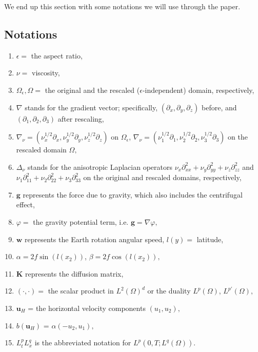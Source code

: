\documentclass[11pt]{article}
\begin{document}
We end up this section with some notations we will use through the paper.

\subsection{Notations}

\begin{enumerate}

\item $\epsilon = $ the aspect ratio,
\item $\nu = $ viscosity,
\item $\Omega_\epsilon, \Omega = $ the original and the rescaled ($\epsilon$-independent) domain, respectively,
\item $\nabla$ stands for the gradient vector; specifically, $(\partial_x, \partial_y, \partial_z)$ before, and $(\partial_1, \partial_2, \partial_3)$ after rescaling,
\item $\nabla_\nu = (\nu_x^{1/2} \partial_x, \nu_y^{1/2} \partial_y, \nu_z^{1/2} \partial_z)$ on $\Omega_\epsilon$, $\nabla_\nu = (\nu_1^{1/2} \partial_1, \nu_2^{1/2} \partial_2, \nu_3^{1/2} \partial_3)$ on the rescaled domain $\Omega,$
\item $ \Delta_\nu$ stands for the anisotropic Laplacian operators $\nu_x \partial^2_{xx} + \nu_y \partial^2_{yy} + \nu_z \partial^2_{zz}$ and $\nu_1 \partial^2_{11} + \nu_2 \partial^2_{22} + \nu_3 \partial^2_{33}$ on the original and rescaled domains, respectively,
\item $\mathbf{g}$ represents the force due to gravity, which also includes the centrifugal effect,
\item $\varphi = $ the gravity potential term, i.e. $\mathbf{g} = \nabla \varphi,$
\item $\mathbf{w}$ represents the Earth rotation angular speed, $l(y) = $ latitude,
\item $\alpha = 2 f \sin (l(x_2))$, $\beta = 2 f \cos (l(x_2)),$
\item $\mathbf{K}$ represents the diffusion matrix,
\item $( \cdot,\cdot) = $ the scalar product in $L^2(\Omega)^d$ or the duality $L^p (\Omega)$, $L^{p'} (\Omega),$
\item $\mathbf{u}_H$ = the horizontal velocity components $(u_1, u_2),$
\item $b(\mathbf{u}_H)$ = $\alpha (-u_2 , u_1),$
\item $L^p_t L^q_x$ is the abbreviated notation for $L^p (0, T; L^q(\Omega)).$

\end{enumerate}
\end{document}
